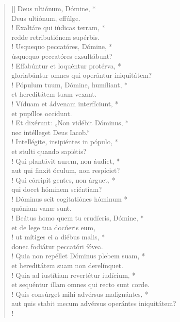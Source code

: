 \begin{verse}[\versewidth]
Deus ultiónum, Dómine, *\\
Deus ultiónum, effúlge.\\!
\vin Exaltáre qui iúdicas terram, *\\
\vin redde retributiónem supérbis.\\!
Usquequo peccatóres, Dómine, *\\
úsquequo peccatóres exsultábunt?\\!
\vin Effabúntur et loquéntur protérva, *\\
\vin gloriabúntur omnes qui operántur iniquitátem?\\!
Pópulum tuum, Dómine, humíliant, *\\
et hereditátem tuam vexant.\\!
\vin Víduam et ádvenam interfíciunt, *\\
\vin et pupíllos occídunt.\\!
Et dixérunt: „Non vidébit Dóminus, *\\
nec intélleget Deus Iacob.“\\!
\vin Intellégite, insipiéntes in pópulo, *\\
\vin et stulti quando sapiétis?\\!
Qui plantávit aurem, non áudiet, *\\
aut qui finxit óculum, non respíciet?\\!
\vin Qui córripit gentes, non árguet, *\\
\vin qui docet hóminem sciéntiam?\\!
Dóminus scit cogitatiónes hóminum *\\
quóniam vanæ sunt.\\!
\vin Beátus homo quem tu erudíeris, Dómine, *\\
\vin et de lege tua docúeris eum,\\!
ut mítiges ei a diébus malis, *\\
donec fodiátur peccatóri fóvea.\\!
\vin Quia non repéllet Dóminus plebem suam, *\\
\vin et hereditátem suam non derelínquet.\\!
Quia ad iustítiam revertétur iudícium, *\\
et sequéntur illam omnes qui recto sunt corde.\\!
\vin Quis consúrget mihi advérsus malignántes, *\\
\vin aut quis stabit mecum advérsus operántes iniquitátem?\\!

\end{verse}
